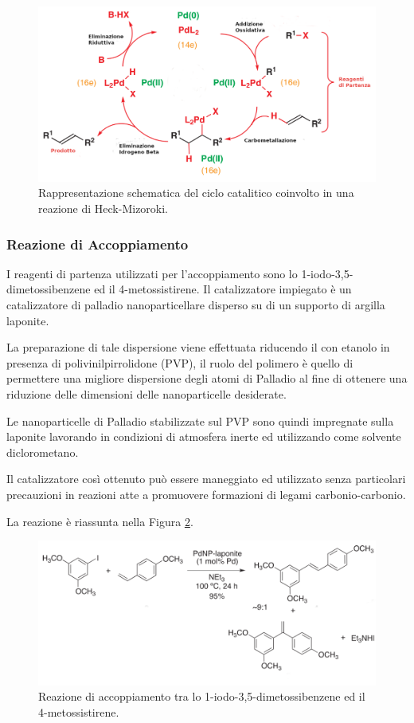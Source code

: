 \documentclass[a4paper, 12pt]{article}
\begin{document}
\begin{figure}[H]
	\centering
	\includegraphics[width=\linewidth]{immagini/heck.png}
	\caption{Rappresentazione schematica del ciclo catalitico coinvolto in una reazione di Heck-Mizoroki.}
	\label{fig:heck}
\end{figure}

\subsubsection{Reazione di Accoppiamento}
I reagenti di partenza utilizzati per l'accoppiamento sono lo 1-iodo-3,5-dimetossibenzene ed il 4-metossistirene. Il catalizzatore impiegato è un catalizzatore di palladio nanoparticellare disperso su di un supporto di argilla laponite.

La preparazione di tale dispersione viene effettuata riducendo il  con etanolo in presenza di polivinilpirrolidone (PVP), il ruolo del polimero è quello di permettere una migliore dispersione degli atomi di Palladio al fine di ottenere una riduzione delle dimensioni delle nanoparticelle desiderate.

Le nanoparticelle di Palladio stabilizzate sul PVP sono quindi impregnate sulla laponite lavorando in condizioni di atmosfera inerte ed utilizzando come solvente diclorometano. \cite{martinez_extremely_2015}

Il catalizzatore così ottenuto può essere maneggiato ed utilizzato senza particolari precauzioni in reazioni atte a promuovere formazioni di legami carbonio-carbonio.

La reazione è riassunta nella Figura \ref{fig:h-m_resveratrolo}.

\begin{figure}[H]
	\centering
	\includegraphics[width=\linewidth]{immagini/h-m_resveratrolo.png}
	\caption{Reazione di accoppiamento tra lo 1-iodo-3,5-dimetossibenzene ed il 4-metossistirene.}
	\label{fig:h-m_resveratrolo}
\end{figure}
\end{document}

